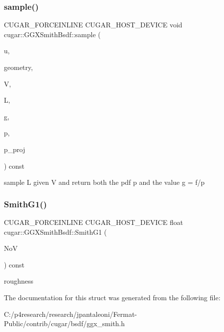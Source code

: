 \subsubsection{\texorpdfstring{sample()}{sample()}}
{\footnotesize\ttfamily C\+U\+G\+A\+R\+\_\+\+F\+O\+R\+C\+E\+I\+N\+L\+I\+NE C\+U\+G\+A\+R\+\_\+\+H\+O\+S\+T\+\_\+\+D\+E\+V\+I\+CE void cugar\+::\+G\+G\+X\+Smith\+Bsdf\+::sample (\begin{DoxyParamCaption}\item[{const \hyperlink{structcugar_1_1_vector}{Vector3f}}]{u,  }\item[{const \hyperlink{structcugar_1_1_differential_geometry}{Differential\+Geometry} \&}]{geometry,  }\item[{const \hyperlink{structcugar_1_1_vector}{Vector3f}}]{V,  }\item[{\hyperlink{structcugar_1_1_vector}{Vector3f} \&}]{L,  }\item[{\hyperlink{structcugar_1_1_vector}{Vector3f} \&}]{g,  }\item[{float \&}]{p,  }\item[{float \&}]{p\+\_\+proj }\end{DoxyParamCaption}) const\hspace{0.3cm}{\ttfamily [inline]}}

sample L given V and return both the pdf p and the value g = f/p \mbox{\label{structcugar_1_1_g_g_x_smith_bsdf_a474b54da3eff2a3c9d62b9a8cc897480}} 
\subsubsection{\texorpdfstring{Smith\+G1()}{SmithG1()}}
{\footnotesize\ttfamily C\+U\+G\+A\+R\+\_\+\+F\+O\+R\+C\+E\+I\+N\+L\+I\+NE C\+U\+G\+A\+R\+\_\+\+H\+O\+S\+T\+\_\+\+D\+E\+V\+I\+CE float cugar\+::\+G\+G\+X\+Smith\+Bsdf\+::\+Smith\+G1 (\begin{DoxyParamCaption}\item[{const float}]{NoV }\end{DoxyParamCaption}) const\hspace{0.3cm}{\ttfamily [inline]}}

roughness 

The documentation for this struct was generated from the following file\+:\begin{DoxyCompactItemize}
\item 
C\+:/p4research/research/jpantaleoni/\+Fermat-\/\+Public/contrib/cugar/bsdf/ggx\+\_\+smith.\+h\end{DoxyCompactItemize}
